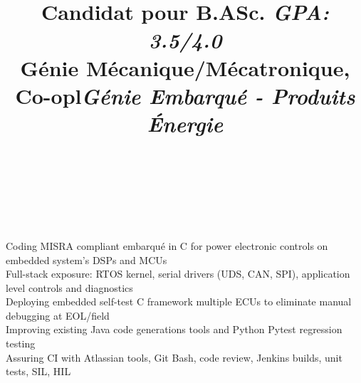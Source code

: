 \documentclass[mm]{res}
\begin{document}
\begin{resume}
\title{Candidat pour B.ASc. \textsl{GPA: 3.5/4.0}\\
G\'enie M\'ecanique/M\'ecatronique, Co-op}
\begin{position}
\end{position}


\toprule

\section{\headingexperience}
\begin{format}
\\
\title{l}\\
\body\\
\end{format}

\title{\textsl{G\'enie Embarqu\'e - Produits \'Energie}}
\begin{position}
\tb Coding MISRA compliant embarqu\'e in C for power electronic controls on embedded system's DSPs and MCUs\\
\tb Full-stack exposure: RTOS kernel, serial drivers (UDS, CAN, SPI), application level controls and diagnostics\\
\tb Deploying embedded self-test C framework multiple ECUs to eliminate manual debugging at EOL/field\\
\tb Improving existing Java code generations tools and Python Pytest regression testing\\
\tb Assuring CI with Atlassian tools, Git Bash, code review, Jenkins builds, unit tests, SIL, HIL
\end{position}


\end{resume}
\end{document}
